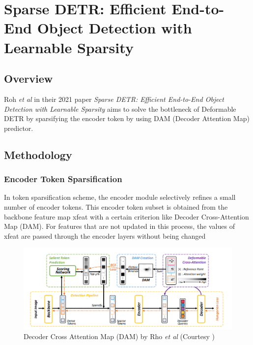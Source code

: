 \section{Sparse DETR: Efficient End-to-End Object Detection with Learnable Sparsity}

\label{appendix:sparse-detr-paper}

\subsection{Overview}

\par Roh \textit{et al} in their 2021 paper \textit{Sparse DETR: Efficient End-to-End Object Detection with Learnable Sparsity} aims to solve the bottleneck of Deformable DETR by sparsifying the encoder token by using DAM (Decoder Attention Map) predictor.\par

\subsection{Methodology}
\subsubsection{Encoder Token Sparsification} 
\par In token sparsification scheme, the encoder module selectively refines a small number of encoder tokens. This encoder token subset is obtained from the backbone feature map xfeat with a certain criterion like Decoder Cross-Attention Map (DAM). For features that are not updated in this process, the values of xfeat are passed through the encoder layers without being changed

\begin{figure}[h]
	\centering
	\includegraphics[width=\linewidth]{assets/img/sparse-detr-dam.png}
	\caption{ Decoder Cross Attention Map (DAM) by Rho
		\textit{et al} (Courtesy \cite{roh2021sparse})}
\end{figure}

